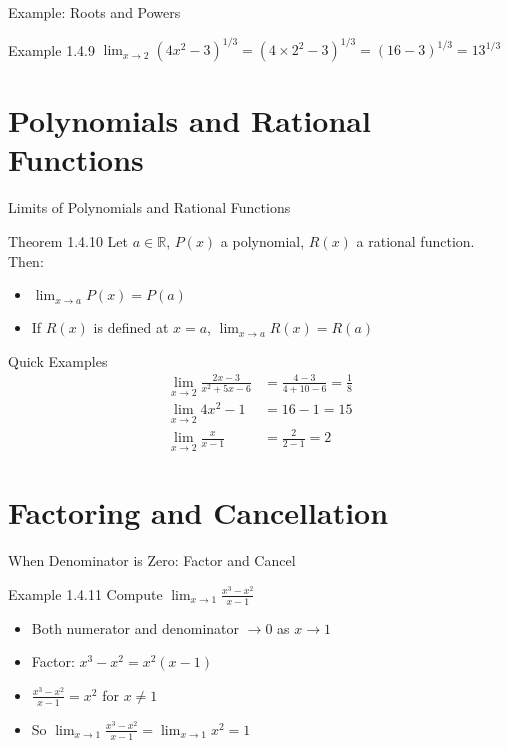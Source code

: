 \documentclass[aspectratio=169]{beamer}
\newcommand{\limx}[2]{\lim_{x \to #1} #2}
\begin{document}
\begin{frame}{Example: Roots and Powers}
\begin{block}{Example 1.4.9}
$\limx{2}{(4x^2-3)^{1/3}} = (4 \times 2^2 - 3)^{1/3} = (16-3)^{1/3} = 13^{1/3}$
\end{block}
\end{frame}

\section{Polynomials and Rational Functions}

\begin{frame}{Limits of Polynomials and Rational Functions}
\begin{block}{Theorem 1.4.10}
Let $a \in \mathbb{R}$, $P(x)$ a polynomial, $R(x)$ a rational function. Then:
\begin{itemize}
  \item $\limx{a}{P(x)} = P(a)$
  \item If $R(x)$ is defined at $x=a$, $\limx{a}{R(x)} = R(a)$
\end{itemize}
\end{block}
\end{frame}

\begin{frame}{Quick Examples}
\begin{align*}
  \limx{2}{\frac{2x-3}{x^2+5x-6}} &= \frac{4-3}{4+10-6} = \frac{1}{8} \\
  \limx{2}{4x^2-1} &= 16-1 = 15 \\
  \limx{2}{\frac{x}{x-1}} &= \frac{2}{2-1} = 2
\end{align*}
\end{frame}

\section{Factoring and Cancellation}

\begin{frame}{When Denominator is Zero: Factor and Cancel}
\begin{block}{Example 1.4.11}
Compute $\limx{1}{\frac{x^3-x^2}{x-1}}$
\end{block}
\begin{itemize}
  \item Both numerator and denominator $\to 0$ as $x \to 1$
  \item Factor: $x^3-x^2 = x^2(x-1)$
  \item $\frac{x^3-x^2}{x-1} = x^2$ for $x \neq 1$
  \item So $\limx{1}{\frac{x^3-x^2}{x-1}} = \limx{1}{x^2} = 1$
\end{itemize}
\end{frame}
\end{document}
